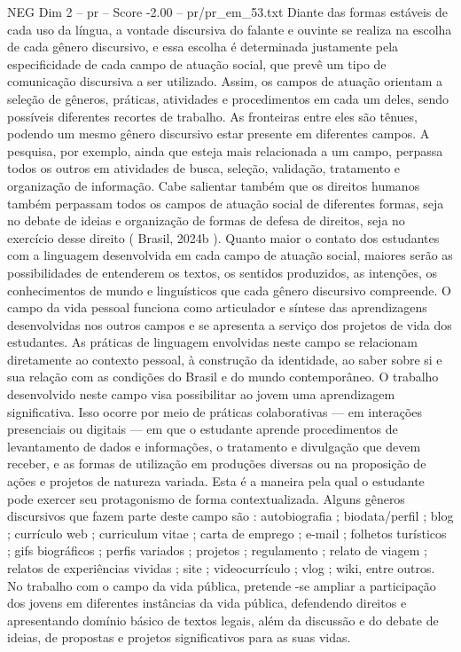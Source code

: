 \begin{textsample}{NEG Dim 2 – pr – Score -2.00 – pr/pr\_em\_53.txt}
Diante das formas estáveis de cada uso da língua, a vontade discursiva do falante e ouvinte se realiza na escolha de cada gênero discursivo, e essa escolha é determinada justamente pela especificidade de cada campo de atuação social, que prevê um tipo de comunicação discursiva a ser utilizado.
Assim, os campos de atuação orientam a seleção de gêneros, práticas, atividades e procedimentos em cada um deles, sendo possíveis diferentes recortes de trabalho.
As fronteiras entre eles são tênues, podendo um mesmo gênero discursivo estar presente em diferentes campos.
A pesquisa, por exemplo, ainda que esteja mais relacionada a um campo, perpassa todos os outros em atividades de busca, seleção, validação, tratamento e organização de informação.
Cabe salientar também que os direitos humanos também perpassam todos os campos de atuação social de diferentes formas, seja no debate de ideias e organização de formas de defesa de direitos, seja no exercício desse direito ( Brasil, 2024b ).
Quanto maior o contato dos estudantes com a linguagem desenvolvida em cada campo de atuação social, maiores serão as possibilidades de entenderem os textos, os sentidos produzidos, as intenções, os conhecimentos de mundo e linguísticos que cada gênero discursivo compreende.
O campo da vida pessoal funciona como articulador e síntese das aprendizagens desenvolvidas nos outros campos e se apresenta a serviço dos projetos de vida dos estudantes.
As práticas de linguagem envolvidas neste campo se relacionam diretamente ao contexto pessoal, à construção da identidade, ao saber sobre si e sua relação com as condições do Brasil e do mundo contemporâneo.
O trabalho desenvolvido neste campo visa possibilitar ao jovem uma aprendizagem significativa.
Isso ocorre por meio de práticas colaborativas — em interações presenciais ou digitais — em que o estudante aprende procedimentos de levantamento de dados e informações, o tratamento e divulgação que devem receber, e as formas de utilização em produções diversas ou na proposição de ações e projetos de natureza variada.
Esta é a maneira pela qual o estudante pode exercer seu protagonismo de forma contextualizada.
Alguns gêneros discursivos que fazem parte deste campo são : autobiografia ; biodata/perfil ; blog ; currículo web ; curriculum vitae ; carta de emprego ; e-mail ; folhetos turísticos ; gifs biográficos ; perfis variados ; projetos ; regulamento ; relato de viagem ; relatos de experiências vividas ; site ; videocurrículo ; vlog ; wiki, entre outros.
No trabalho com o campo da vida pública, pretende -se ampliar a participação dos jovens em diferentes instâncias da vida pública, defendendo direitos e apresentando domínio básico de textos legais, além da discussão e do debate de ideias, de propostas e projetos significativos para as suas vidas.

\end{textsample}
